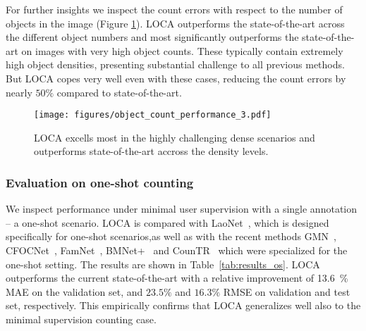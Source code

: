 \documentclass[10pt,twocolumn,letterpaper]{article}
\begin{document}
For further insights we inspect the count errors with respect to the number of objects in the image (Figure \ref{fig:obj_count}).
LOCA outperforms the state-of-the-art across the different object numbers and most significantly outperforms the state-of-the-art on images with very high object counts. These typically contain extremely high object densities, presenting substantial challenge to all previous methods. But LOCA copes very well even with these cases, reducing the count errors by nearly $50\%$ compared to state-of-the-art.



\begin{figure}
    \centering
    \texttt{[image: figures/object\_count\_performance\_3.pdf]}
    \caption{LOCA excells most in the highly challenging dense scenarios and outperforms state-of-the-art accross the density levels.
}
    \label{fig:obj_count}
\end{figure}





\subsubsection{Evaluation on one-shot counting}
We inspect performance under minimal user supervision with a single annotation -- a one-shot scenario. LOCA is compared with LaoNet~\cite{laonet}, which is designed specifically for one-shot scenarios,as well as with the recent methods GMN~\cite{gmn}, CFOCNet~\cite{cfocnet}, FamNet~\cite{famnet}, BMNet+~\cite{bmnet} and CounTR~\cite{countr} which were specialized for the one-shot setting.
The results are shown in Table~\ref{tab:results_os}. LOCA outperforms the current state-of-the-art with a relative improvement of 13.6~\% MAE on the validation set, and $23.5\%$ and $16.3\%$ RMSE on validation and test set, respectively. This empirically confirms that LOCA generalizes well also to the minimal supervision counting case.
\end{document}
